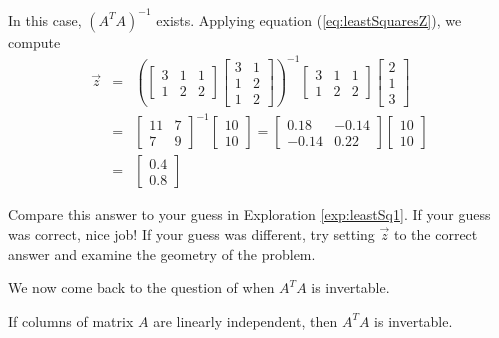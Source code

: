 \documentclass{ximera}
\begin{document}
\begin{example}
\begin{explanation}
In this case, $(A^TA)^{-1}$ exists.  Applying equation (\ref{eq:leastSquaresZ}), we compute
\begin{eqnarray*}
\vec{z}&=&\left(\begin{bmatrix}3 & 1 & 1\\1 & 2 & 2\end{bmatrix}\begin{bmatrix}3 & 1\\1 & 2\\1& 2\end{bmatrix}\right)^{-1}\begin{bmatrix}3 & 1 & 1\\1 & 2 & 2\end{bmatrix}\begin{bmatrix}2\\1\\3\end{bmatrix}\\
&=&\begin{bmatrix}11 & 7\\7 & 9\end{bmatrix}^{-1}\begin{bmatrix}10\\10\end{bmatrix}=\begin{bmatrix}0.18 & -0.14\\-0.14 & 0.22\end{bmatrix}\begin{bmatrix}10\\10\end{bmatrix}\\
&=&\begin{bmatrix}0.4\\0.8\end{bmatrix}
    \end{eqnarray*}    
\end{explanation}
Compare this answer to your guess in Exploration \ref{exp:leastSq1}.  If your guess was correct, nice job!  If your guess was different, try setting $\vec{z}$ to the correct answer and examine the geometry of the problem.    
\end{example}

We now come back to the question of when $A^TA$ is invertable.

\begin{theorem}\label{th:ATAinverse}
If columns of matrix $A$ are linearly independent, then $A^TA$ is invertable.    
\end{theorem}
\end{document}
